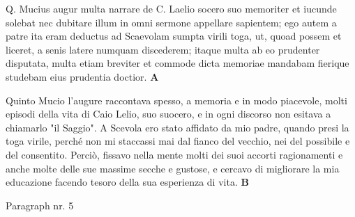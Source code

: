 \documentclass[b5paper]{book}
\begin{document}
\pausenumbering
\begin{pairs}
\begin{Leftside}
\resumenumbering
\numberpstartfalse
	\pstart\noindent Q. Mucius augur multa narrare de C. Laelio socero suo memoriter et iucunde solebat nec dubitare illum in omni sermone appellare sapientem; ego autem a patre ita eram deductus ad Scaevolam sumpta virili toga, ut, quoad possem et liceret, a senis latere numquam discederem; itaque multa ab eo prudenter disputata, multa etiam breviter et commode dicta memoriae mandabam fierique studebam eius prudentia doctior. \textbf{A}\pend
\pausenumbering
\end{Leftside}

\begin{Rightside}
\resumenumbering
\numberpstartfalse
	\pstart\noindent Quinto Mucio l'augure raccontava spesso, a memoria e in modo piacevole, molti episodi della vita di Caio Lelio, suo suocero, e in ogni discorso non esitava a chiamarlo "il Saggio". A Scevola ero stato affidato da mio padre, quando presi la toga virile, perché non mi staccassi mai dal fianco del vecchio, nei  del possibile e del consentito. Perciò, fissavo nella mente molti dei suoi accorti ragionamenti e anche molte delle sue massime secche e gustose, e cercavo di migliorare la mia educazione facendo tesoro della sua esperienza di vita. \textbf{B}\pend
\pausenumbering
\end{Rightside}
\end{pairs}
\Columns

\resumenumbering
\numberpstarttrue

\pstart%
	Paragraph nr. 5%
\pend
\end{document}

